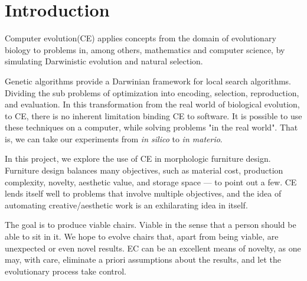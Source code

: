 \section{Introduction}
Computer evolution(CE) applies concepts from the domain of evolutionary
biology to problems in, among others, mathematics and computer science,
by simulating Darwinistic evolution and natural selection.

Genetic algorithms provide a Darwinian framework for local search algorithms.
Dividing the sub problems of optimization into encoding, selection,
reproduction, and evaluation. In this transformation from the real world of
biological evolution, to CE, there is no inherent limitation binding CE to
software. It is possible to use these techniques on a computer, while solving
problems "in the real world". That is, we can take our experiments from
\emph{in silico} to \emph{in materio}\cite{paper:ev3}.

In this project, we explore the use of CE in morphologic furniture design.
Furniture design balances many objectives, such as material cost, production
complexity, novelty, aesthetic value, and storage space --- to point out a few.
CE lends itself well to problems that involve multiple objectives, and the idea
of automating creative/aesthetic work is an exhilarating idea in itself.

The goal is to produce viable chairs. Viable in the sense that a person should 
be able to sit in it. We hope to evolve chairs that, apart from being viable,
are unexpected or even novel results. EC can be an excellent means of novelty,
as one may, with care, eliminate a priori assumptions about the results, and let
the evolutionary process take control.

